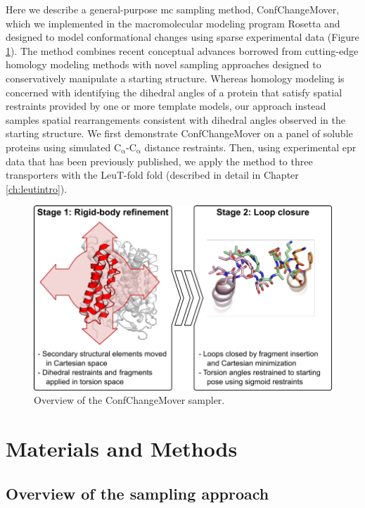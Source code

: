 Here we describe a general-purpose \gls{mc} sampling method, ConfChangeMover, which we implemented in the macromolecular modeling program Rosetta \citep*{Leaver-fay2011, Leman2020} and designed to model conformational changes using sparse experimental data (Figure \ref{fig:ccm_scheme}). The method combines recent conceptual advances borrowed from cutting-edge homology modeling methods with novel sampling approaches designed to conservatively manipulate a starting structure. Whereas homology modeling is concerned with identifying the dihedral angles of a protein that satisfy spatial restraints provided by one or more template models, our approach instead samples spatial rearrangements consistent with dihedral angles observed in the starting structure. We first demonstrate ConfChangeMover on a panel of soluble proteins using simulated $\mathrm{C_{\upalpha}}$-$\mathrm{C_{\upalpha}}$ distance restraints. Then, using experimental \gls{epr} data that has been previously published, we apply the method to three transporters with the LeuT-fold fold (described in detail in Chapter \ref{ch:leutintro}).


\begin{figure}[h]
\centering
\includegraphics[width=5in]{Figures/ccm_scheme.pdf}
 \caption[Overview of the ConfChangeMover sampler.]{Overview of the ConfChangeMover sampler.}
\label{fig:ccm_scheme}
\end{figure}


\section{Materials and Methods}

\subsection{Overview of the sampling approach}


